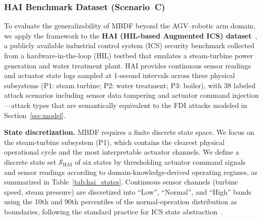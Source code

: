 \documentclass[manuscript,screen,review]{acmart}
\begin{document}
\subsubsection{HAI Benchmark Dataset (Scenario~C)}
\label{sec:hai_setup}

To evaluate the generalizability of MBDF beyond the
AGV--robotic arm domain, we apply the framework to the
\textbf{HAI (HIL-based Augmented ICS) dataset}~\cite{ref_hai},
a publicly available industrial control system (ICS)
security benchmark collected from a hardware-in-the-loop
(HIL) testbed that emulates a steam-turbine power generation
and water treatment plant. HAI provides continuous sensor
readings and actuator state logs sampled at 1-second
intervals across three physical subsystems
(P1: steam turbine; P2: water treatment; P3: boiler),
with 38 labeled attack scenarios including sensor data
tampering and actuator command injection---attack types
that are semantically equivalent to the FDI attacks
modeled in Section~\ref{sec:model}.

\textbf{State discretization.}
MBDF requires a finite discrete state space. We focus on
the steam-turbine subsystem (P1), which contains the
clearest physical operational cycle and the most
interpretable actuator channels. We define a discrete
state set $\mathcal{S}_{\mathrm{HAI}}$ of six states
by thresholding actuator command signals and sensor
readings according to domain-knowledge-derived operating
regimes, as summarized in Table~\ref{tab:hai_states}.
Continuous sensor channels (turbine speed, steam pressure)
are discretized into ``Low'', ``Normal'', and ``High''
bands using the 10th and 90th percentiles of the
normal-operation distribution as boundaries, following
the standard practice for ICS state abstraction~\cite{ref16}.
\end{document}
